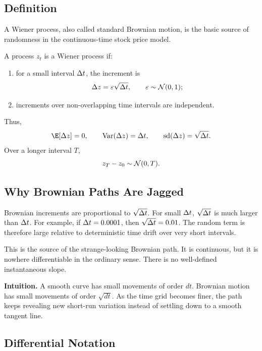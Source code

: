 \subsection{Definition}

A Wiener process, also called standard Brownian motion, is the basic source of
randomness in the continuous-time stock price model.

\begin{defN}
A process $z_t$ is a Wiener process if:
\begin{enumerate}
    \item for a small interval $\Delta t$, the increment is
    \[
        \Delta z = \varepsilon \sqrt{\Delta t},
        \qquad
        \varepsilon\sim\mathcal{N}(0,1);
    \]
    \item increments over non-overlapping time intervals are independent.
\end{enumerate}
\end{defN}

Thus,
\[
    \E[\dz]=0,
    \qquad
    \Var(\dz)=\dt,
    \qquad
    \operatorname{sd}(\dz)=\sqrt{\dt}.
\]
Over a longer interval $T$,
\[
    z_T-z_0 \sim \mathcal{N}(0,T).
\]

\subsection{Why Brownian Paths Are Jagged}

Brownian increments are proportional to $\sqrt{\Delta t}$. For small $\Delta t$,
$\sqrt{\Delta t}$ is much larger than $\Delta t$. For example, if
$\Delta t=0.0001$, then $\sqrt{\Delta t}=0.01$. The random term is therefore large
relative to deterministic time drift over very short intervals.

This is the source of the strange-looking Brownian path. It is continuous, but
it is nowhere differentiable in the ordinary sense. There is no well-defined
instantaneous slope.

\begin{boxF}
\textbf{Intuition.} A smooth curve has small movements of order $dt$. Brownian
motion has small movements of order $\sqrt{dt}$. As the time grid becomes
finer, the path keeps revealing new short-run variation instead of settling
down to a smooth tangent line.
\end{boxF}

\subsection{Differential Notation}

